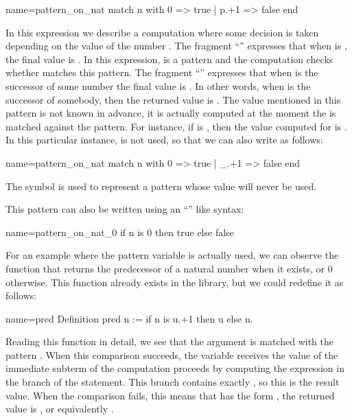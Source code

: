 \begin{coq}{name=pattern_on_nat}{}
match n with 0 => true | p.+1 => false end
\end{coq}
In this expression we describe a computation where some decision is
taken depending on the value of the number .  The fragment 
``'' expresses that when  is , the final value is
.  In this expression,  is a pattern and the computation
checks whether  matches this pattern.  The fragment
``''  expresses that when  is the successor of
some number  the final value is .  In other words, when
 is the successor of somebody, then the returned value is
.  The value  mentioned in this pattern is not known in
advance, it is actually computed at the moment the  is matched
against the pattern.  For instance, if  is , then the value
computed for  is .  In this particular instance,  is
not used, so that we can also write as follows:

\begin{coq}{name=pattern_on_nat}{}
match n with 0 => true | _.+1 => false end
\end{coq}
The symbol \C{_} is used to represent a pattern whose value will never be
used.

This pattern can also be written using an ``'' like
syntax:

\begin{coq}{name=pattern_on_nat_0}{}
if n is 0 then true else false
\end{coq}

For an example where the pattern variable is actually used, we can
observe the function that returns the predecessor of a natural number
when it exists, or 0 otherwise.  This function already exists in the library,
but we could redefine it as follows:

\begin{coq}{name=pred}{}
Definition pred n := if n is u.+1 then u else n.
\end{coq}
Reading this function in detail, we see that the argument  is
matched with the pattern .  When this comparison
succeeds, the variable  receives the value of the immediate
subterm of  the computation proceeds by computing the expression
in the  branch of the  statement.  This branch contains
exactly , so this is the result value.  When the comparison
fails, this means that  has the form , the returned value is
, or equivalently .

